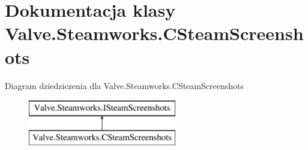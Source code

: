 \hypertarget{class_valve_1_1_steamworks_1_1_c_steam_screenshots}{}\section{Dokumentacja klasy Valve.\+Steamworks.\+C\+Steam\+Screenshots}
\label{class_valve_1_1_steamworks_1_1_c_steam_screenshots}
Diagram dziedziczenia dla Valve.\+Steamworks.\+C\+Steam\+Screenshots\begin{figure}[H]
\begin{center}
\leavevmode
\includegraphics[height=2.000000cm]{class_valve_1_1_steamworks_1_1_c_steam_screenshots}
\end{center}
\end{figure}

